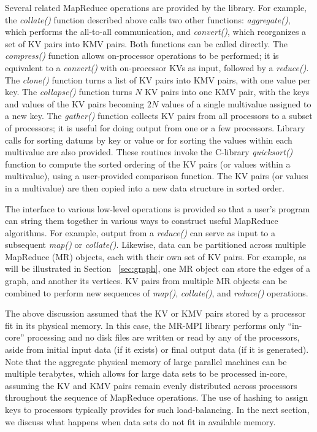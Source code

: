 Several related MapReduce operations are provided by the library.  For
example, the {\it collate()} function described above calls two other
functions: {\it aggregate()}, which performs the all-to-all
communication, and {\it convert()}, which reorganizes a set of KV
pairs into KMV pairs.  Both functions can be called directly.  The
{\it compress()} function allows on-processor operations to be
performed; it is equivalent to a {\it convert()} with on-processor KVs
as input, followed by a {\it reduce()}.  The {\it clone()} function
turns a list of KV pairs into KMV pairs, with one value per key.  The
{\it collapse()} function turns $N$ KV pairs into one KMV pair, with
the keys and values of the KV pairs becoming $2N$ values of a single
multivalue assigned to a new key.  The {\it gather()} function
collects KV pairs from all processors to a subset of processors; it is
useful for doing output from one or a few processors.  Library calls
for sorting datums by key or value or for sorting the values within
each multivalue are also provided.  These routines invoke the
C-library {\it quicksort()} function to compute the sorted ordering of
the KV pairs (or values within a multivalue), using a user-provided
comparison function.  The KV pairs (or values in a multivalue) are
then copied into a new data structure in sorted order.

The interface to various low-level operations is provided so that a
user's program can string them together in various ways to construct
useful MapReduce algorithms.  For example, output from a {\it
reduce()} can serve as input to a subsequent {\it map()} or {\it
collate()}.  Likewise, data can be partitioned across multiple
MapReduce (MR) objects, each with their own set of KV pairs.  For
example, as will be illustrated in Section ~\ref{sec:graph}, one MR
object can store the edges of a graph, and another its vertices.  KV
pairs from multiple MR objects can be combined to perform new
sequences of {\it map()}, {\it collate()}, and {\it reduce()}
operations.

The above discussion assumed that the KV or KMV pairs stored by a
processor fit in its physical memory.  In this case, the MR-MPI
library performs only ``in-core'' processing and no disk files are
written or read by any of the processors, aside from initial input
data (if it exists) or final output data (if it is generated).  Note
that the aggregate physical memory of large parallel machines can be
multiple terabytes, which allows for large data sets to be processed
in-core, assuming the KV and KMV pairs remain evenly distributed
across processors throughout the sequence of MapReduce operations.
The use of hashing to assign keys to processors typically provides for
such load-balancing.  In the next section, we discuss what happens
when data sets do not fit in available memory.
